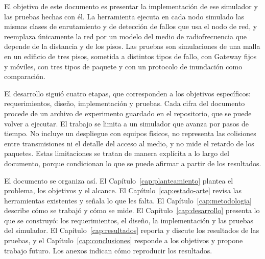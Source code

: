 El objetivo de este documento es presentar la implementación de ese simulador y
las pruebas hechas con él. La herramienta ejecuta en cada nodo simulado las
mismas clases de enrutamiento y de detección de fallos que usa el nodo de red, y
reemplaza únicamente la red por un modelo del medio de radiofrecuencia que
depende de la distancia y de los pisos. Las pruebas son simulaciones de una malla
en un edificio de tres pisos, sometida a distintos tipos de fallo, con Gateway
fijos y móviles, con tres tipos de paquete y con un protocolo de inundación como
comparación.

El desarrollo siguió cuatro etapas, que corresponden a los objetivos
específicos: requerimientos, diseño, implementación y pruebas. Cada cifra del
documento procede de un archivo de experimento guardado en el repositorio, que
se puede volver a ejecutar. El trabajo se limita a un simulador que avanza por
pasos de tiempo. No incluye un despliegue con equipos físicos, no representa
las colisiones entre transmisiones ni el detalle del acceso al medio, y no mide
el retardo de los paquetes. Estas limitaciones se tratan de manera explícita a lo
largo del documento, porque condicionan lo que se puede afirmar a partir de los
resultados.

El documento se organiza así. El Capítulo~\ref{cap:planteamiento} plantea el
problema, los objetivos y el alcance. El Capítulo~\ref{cap:estado-arte} revisa
las herramientas existentes y señala lo que les falta. El
Capítulo~\ref{cap:metodologia} describe cómo se trabajó y cómo se mide. El
Capítulo~\ref{cap:desarrollo} presenta lo que se construyó: los requerimientos,
el diseño, la implementación y las pruebas del simulador. El
Capítulo~\ref{cap:resultados} reporta y discute los resultados de las pruebas, y
el Capítulo~\ref{cap:conclusiones} responde a los objetivos y propone trabajo
futuro. Los anexos indican cómo reproducir los resultados.
